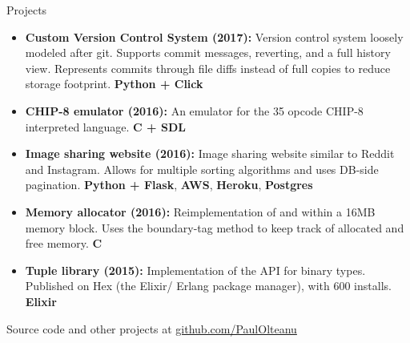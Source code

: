 \documentclass[calibri]{mcdowellcv}
\begin{document}
    \begin{cvsection}{\Large{Projects}}
        \begin{cvsubsection}{}{}{}
            \begin{itemize}
                \item \textbf{Custom Version Control System (2017):} Version control system loosely modeled after git. Supports commit messages, reverting, and a full history view. Represents commits through file diffs instead of full copies to reduce storage footprint. \textbf{Python + Click}
                \item \textbf{CHIP-8 emulator (2016):} An emulator for the 35 opcode CHIP-8 interpreted language. \textbf{C + SDL}
                \item \textbf{Image sharing website (2016):} Image sharing website similar to Reddit and Instagram. Allows for multiple sorting algorithms and uses DB-side pagination. \textbf{Python + Flask}, \textbf{AWS}, \textbf{Heroku}, \textbf{Postgres}
                \item \textbf{Memory allocator (2016):} Reimplementation of  and  within a 16MB memory block. Uses the boundary-tag method to keep track of allocated and free memory. \textbf{C}
                \item \textbf{Tuple library (2015):} Implementation of the  API for binary types. Published on Hex (the Elixir/ Erlang package manager), with 600 installs. \textbf{Elixir}
            \end{itemize}
            Source code and other projects at \underline{github.com/PaulOlteanu}
        \end{cvsubsection}
    \end{cvsection}
\end{document}
